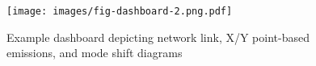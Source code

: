 \documentclass[3p,times,procedia]{elsarticle}
\begin{document}
\begin{figure}
  \centering
  \texttt{[image: images/fig-dashboard-2.png.pdf]}
  \caption{Example dashboard depicting network link, X/Y point-based emissions, and mode shift diagrams}
  \label{fig:chart2}
\end{figure}








\end{document}
